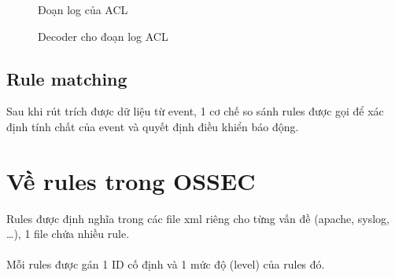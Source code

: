    \begin{figure}[h!]
	\centering 
{}
	\caption{Đoạn log của ACL}
	\end{figure}
	\begin{figure}[h!]
	\centering 
{}
	\caption{Decoder cho đoạn log ACL}
  \end{figure}
       \subsection{Rule matching}
        Sau khi rút trích được dữ liệu từ event, 1 cơ
       chế so sánh rules được gọi để xác định tính chất của event và quyết định điều khiển báo động.
\section{Về rules trong OSSEC}
Rules được định nghĩa trong các file xml riêng cho từng vấn đề (apache,
syslog, \dots), 1 file chứa nhiều rule.\\\\  
Mỗi rules được gán 1 ID cố
định và 1 mức độ (level) của rules đó.
